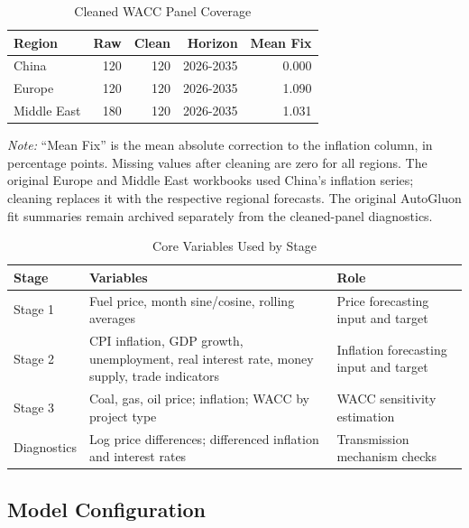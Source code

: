 \begin{table}[!ht]
\centering
\caption{Cleaned WACC Panel Coverage}
\label{tab:appendix-cleaned-wacc}
\scriptsize
\begin{tabular}{lrrrr}
\toprule
\textbf{Region} & \textbf{Raw} & \textbf{Clean} & \textbf{Horizon} & \textbf{Mean Fix} \\
\midrule
China & 120 & 120 & 2026-2035 & 0.000 \\
Europe & 120 & 120 & 2026-2035 & 1.090 \\
Middle East & 180 & 120 & 2026-2035 & 1.031 \\
\bottomrule
\end{tabular}
\vspace{2pt}

\raggedright\scriptsize
\textit{Note:} ``Mean Fix'' is the mean absolute correction to the inflation column, in percentage points. Missing values after cleaning are zero for all regions. The original Europe and Middle East workbooks used China's inflation series; cleaning replaces it with the respective regional forecasts. The original AutoGluon fit summaries remain archived separately from the cleaned-panel diagnostics.
\end{table}

\begin{table}[!ht]
\centering
\caption{Core Variables Used by Stage}
\label{tab:appendix-core-variables}
\scriptsize
\begin{tabular}{P{0.23\columnwidth}P{0.35\columnwidth}P{0.30\columnwidth}}
\toprule
\textbf{Stage} & \textbf{Variables} & \textbf{Role} \\
\midrule
Stage 1 & Fuel price, month sine/cosine, rolling averages & Price forecasting input and target \\
Stage 2 & CPI inflation, GDP growth, unemployment, real interest rate, money supply, trade indicators & Inflation forecasting input and target \\
Stage 3 & Coal, gas, oil price; inflation; WACC by project type & WACC sensitivity estimation \\
Diagnostics & Log price differences; differenced inflation and interest rates & Transmission mechanism checks \\
\bottomrule
\end{tabular}
\end{table}

\subsection{Model Configuration}

